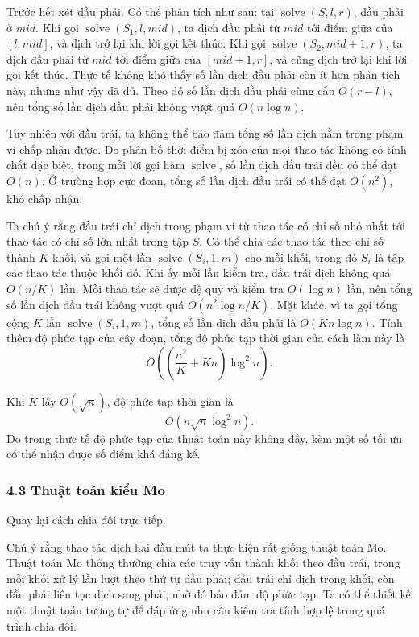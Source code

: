 \documentclass[11pt]{article}
\begin{document}
Trước hết xét đầu phải. Có thể phân tích như sau: tại
\(\operatorname{solve}(S,l,r)\), đầu phải ở \(\mathit{mid}\). Khi gọi
\(\operatorname{solve}(S_1,l,\mathit{mid})\), ta dịch đầu phải từ
\(\mathit{mid}\) tới điểm giữa của \([l,\mathit{mid}]\), và dịch trở lại khi lời
gọi kết thúc. Khi gọi \(\operatorname{solve}(S_2,\mathit{mid}+1,r)\), ta dịch
đầu phải từ \(\mathit{mid}\) tới điểm giữa của \([\mathit{mid}+1,r]\), và cũng
dịch trở lại khi lời gọi kết thúc. Thực tế không khó thấy số lần dịch đầu phải
còn ít hơn phân tích này, nhưng như vậy đã đủ. Theo đó số lần dịch đầu phải cùng
cấp \(O(r-l)\), nên tổng số lần dịch đầu phải không vượt quá \(O(n\log n)\).

Tuy nhiên với đầu trái, ta không thể bảo đảm tổng số lần dịch nằm trong phạm vi
chấp nhận được. Do phân bố thời điểm bị xóa của mọi thao tác không có tính chất
đặc biệt, trong mỗi lời gọi hàm \(\operatorname{solve}\), số lần dịch đầu trái
đều có thể đạt \(O(n)\). Ở trường hợp cực đoan, tổng số lần dịch đầu trái có thể
đạt \(O(n^2)\), khó chấp nhận.

Ta chú ý rằng đầu trái chỉ dịch trong phạm vi từ thao tác có chỉ số nhỏ nhất tới
thao tác có chỉ số lớn nhất trong tập \(S\). Có thể chia các thao tác theo chỉ
số thành \(K\) khối, và gọi một lần \(\operatorname{solve}(S_i,1,m)\) cho mỗi
khối, trong đó \(S_i\) là tập các thao tác thuộc khối đó. Khi ấy mỗi lần kiểm
tra, đầu trái dịch không quá \(O(n/K)\) lần. Mỗi thao tác sẽ được đệ quy và kiểm
tra \(O(\log n)\) lần, nên tổng số lần dịch đầu trái không vượt quá
\(O(n^2\log n/K)\). Mặt khác, vì ta gọi tổng cộng \(K\) lần
\(\operatorname{solve}(S_i,1,m)\), tổng số lần dịch đầu phải là \(O(Kn\log n)\).
Tính thêm độ phức tạp của cây đoạn, tổng độ phức tạp thời gian của cách làm này
là
\[
  O\left(\left(\frac{n^2}{K}+Kn\right)\log^2 n\right).
\]

Khi \(K\) lấy \(O(\sqrt n)\), độ phức tạp thời gian là
\[
  O(n\sqrt n\log^2 n).
\]
Do trong thực tế độ phức tạp của thuật toán này không đầy, kèm một số tối ưu có
thể nhận được số điểm khá đáng kể.

\subsubsection*{4.3 Thuật toán kiểu Mo}

Quay lại cách chia đôi trực tiếp.

Chú ý rằng thao tác dịch hai đầu mút ta thực hiện rất giống thuật toán Mo. Thuật
toán Mo thông thường chia các truy vấn thành khối theo đầu trái, trong mỗi khối
xử lý lần lượt theo thứ tự đầu phải; đầu trái chỉ dịch trong khối, còn đầu phải
liên tục dịch sang phải, nhờ đó bảo đảm độ phức tạp. Ta có thể thiết kế một
thuật toán tương tự để đáp ứng nhu cầu kiểm tra tính hợp lệ trong quá trình chia
đôi.
\end{document}
